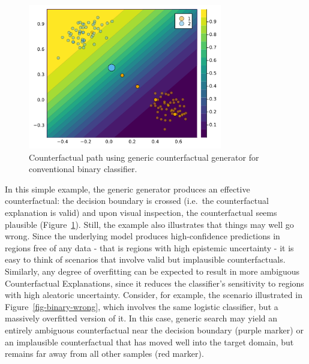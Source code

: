 \documentclass[
  letterpaper,
  DIV=11,
  numbers=noendperiod]{scrartcl}
\begin{document}
\begin{figure}

{\centering \includegraphics[width=3.33333in,height=2.5in]{www/ce_binary.png}

}

\caption{\label{fig-binary}Counterfactual path using generic
counterfactual generator for conventional binary classifier.}

\end{figure}

In this simple example, the generic generator produces an effective
counterfactual: the decision boundary is crossed (i.e.~the
counterfactual explanation is valid) and upon visual inspection, the
counterfactual seems plausible (Figure~\ref{fig-binary}). Still, the
example also illustrates that things may well go wrong. Since the
underlying model produces high-confidence predictions in regions free of
any data - that is regions with high epistemic uncertainty - it is easy
to think of scenarios that involve valid but implausible
counterfactuals. Similarly, any degree of overfitting can be expected to
result in more ambiguous Counterfactual Explanations, since it reduces
the classifier's sensitivity to regions with high aleatoric uncertainty.
Consider, for example, the scenario illustrated in
Figure~\ref{fig-binary-wrong}, which involves the same logistic
classifier, but a massively overfitted version of it. In this case,
generic search may yield an entirely ambiguous counterfactual near the
decision boundary (purple marker) or an implausible counterfactual that
has moved well into the target domain, but remains far away from all
other samples (red marker).
\end{document}
